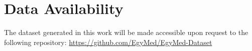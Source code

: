 \documentclass[manuscript,screen,review]{acmart}
\begin{document}
\section{Data Availability}
The dataset generated in this work will be made accessible upon request to the following repository: \url{https://github.com/EgyMed/EgyMed-Dataset}



\end{document}
